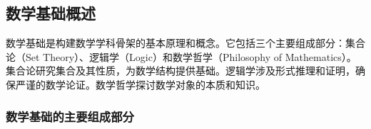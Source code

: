 
\begin{issues}
\issueAi
\end{issues}

\subsection{数学基础概述}

数学基础是构建数学学科骨架的基本原理和概念。它包括三个主要组成部分：集合论（Set Theory）、逻辑学（Logic）和数学哲学（Philosophy of Mathematics）。集合论研究集合及其性质，为数学结构提供基础。逻辑学涉及形式推理和证明，确保严谨的数学论证。数学哲学探讨数学对象的本质和知识。

\subsubsection{数学基础的主要组成部分}

